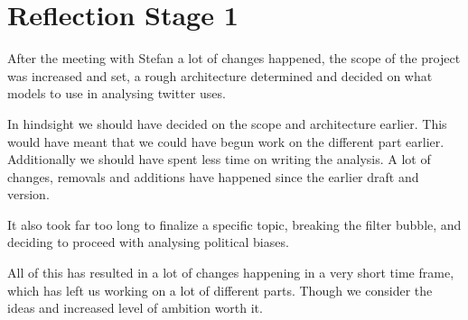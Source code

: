 \section{Reflection Stage 1}
After the meeting with Stefan a lot of changes happened, the scope of the
project was increased and set, a rough architecture determined and decided on
what models to use in analysing twitter uses.\nl

In hindsight we should have decided on the scope and architecture earlier. This
would have meant that we could have begun work on the different part earlier.
Additionally we should have spent less time on writing the analysis. A lot of
changes, removals and additions have happened since the earlier draft and
version.\nl

It also took far too long to finalize a specific topic, breaking the
filter bubble, and deciding to proceed with analysing political biases.\nl

All of this has resulted in a lot of changes happening in a very short time
frame, which has left us working on a lot of different parts. Though we consider the
ideas and increased level of ambition worth it. 

